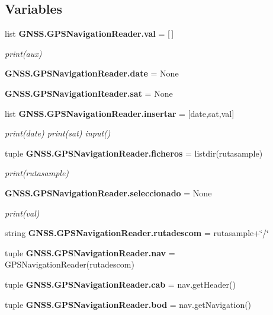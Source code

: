 \subsection*{Variables}
\begin{DoxyCompactItemize}
\item 
list {\bf G\-N\-S\-S.\-G\-P\-S\-Navigation\-Reader.\-val} = [$\,$]
\begin{DoxyCompactList}\small\item\em print(aux) \end{DoxyCompactList}\item 
{\bf G\-N\-S\-S.\-G\-P\-S\-Navigation\-Reader.\-date} = None
\item 
{\bf G\-N\-S\-S.\-G\-P\-S\-Navigation\-Reader.\-sat} = None
\item 
list {\bf G\-N\-S\-S.\-G\-P\-S\-Navigation\-Reader.\-insertar} = [date,sat,val]
\begin{DoxyCompactList}\small\item\em print(date) print(sat) input() \end{DoxyCompactList}\item 
tuple {\bf G\-N\-S\-S.\-G\-P\-S\-Navigation\-Reader.\-ficheros} = listdir(rutasample)
\begin{DoxyCompactList}\small\item\em print(rutasample) \end{DoxyCompactList}\item 
{\bf G\-N\-S\-S.\-G\-P\-S\-Navigation\-Reader.\-seleccionado} = None
\begin{DoxyCompactList}\small\item\em print(val) \end{DoxyCompactList}\item 
string {\bf G\-N\-S\-S.\-G\-P\-S\-Navigation\-Reader.\-rutadescom} = rutasample+\char`\"{}/\char`\"{}
\item 
tuple {\bf G\-N\-S\-S.\-G\-P\-S\-Navigation\-Reader.\-nav} = G\-P\-S\-Navigation\-Reader(rutadescom)
\item 
tuple {\bf G\-N\-S\-S.\-G\-P\-S\-Navigation\-Reader.\-cab} = nav.\-get\-Header()
\item 
tuple {\bf G\-N\-S\-S.\-G\-P\-S\-Navigation\-Reader.\-bod} = nav.\-get\-Navigation()
\end{DoxyCompactItemize}
